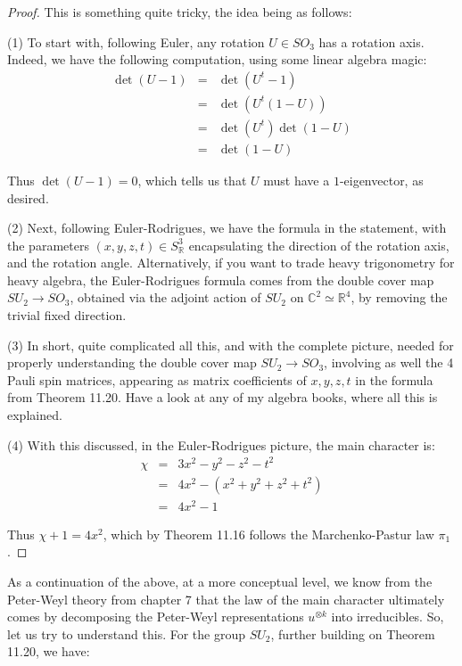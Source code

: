 \documentclass[12pt]{amsbook}
\begin{document}
\begin{proof}
This is something quite tricky, the idea being as follows:

\medskip

(1) To start with, following Euler, any rotation $U\in SO_3$ has a rotation axis. Indeed, we have the following computation, using some linear algebra magic:
\begin{eqnarray*}
\det(U-1)
&=&\det(U^t-1)\\
&=&\det(U^t(1-U))\\
&=&\det(U^t)\det(1-U)\\
&=&\det(1-U)
\end{eqnarray*}

Thus $\det(U-1)=0$, which tells us that $U$ must have a $1$-eigenvector, as desired. 

\medskip

(2) Next, following Euler-Rodrigues, we have the formula in the statement, with the parameters $(x,y,z,t)\in S^3_\mathbb R$ encapsulating the direction of the rotation axis, and the rotation angle. Alternatively, if you want to trade heavy trigonometry for heavy algebra, the Euler-Rodrigues formula comes from the double cover map $SU_2\to SO_3$, obtained via the adjoint action of $SU_2$ on $\mathbb C^2\simeq\mathbb R^4$, by removing the trivial fixed direction.

\medskip

(3) In short, quite complicated all this, and with the complete picture, needed for properly understanding the double cover map $SU_2\to SO_3$, involving as well the 4 Pauli spin matrices, appearing as matrix coefficients of $x,y,z,t$ in the formula from Theorem 11.20. Have a look at any of my algebra books, where all this is explained.

\medskip

(4) With this discussed, in the Euler-Rodrigues picture, the main character is:
\begin{eqnarray*}
\chi
&=&3x^2-y^2-z^2-t^2\\
&=&4x^2-(x^2+y^2+z^2+t^2)\\
&=&4x^2-1
\end{eqnarray*}

Thus $\chi+1=4x^2$, which by Theorem 11.16 follows the Marchenko-Pastur law $\pi_1$.
\end{proof}

As a continuation of the above, at a more conceptual level, we know from the Peter-Weyl theory from chapter 7 that the law of the main character ultimately comes by decomposing the Peter-Weyl representations $u^{\otimes k}$ into irreducibles. So, let us try to understand this. For the group $SU_2$, further building on Theorem 11.20, we have:
\end{document}
